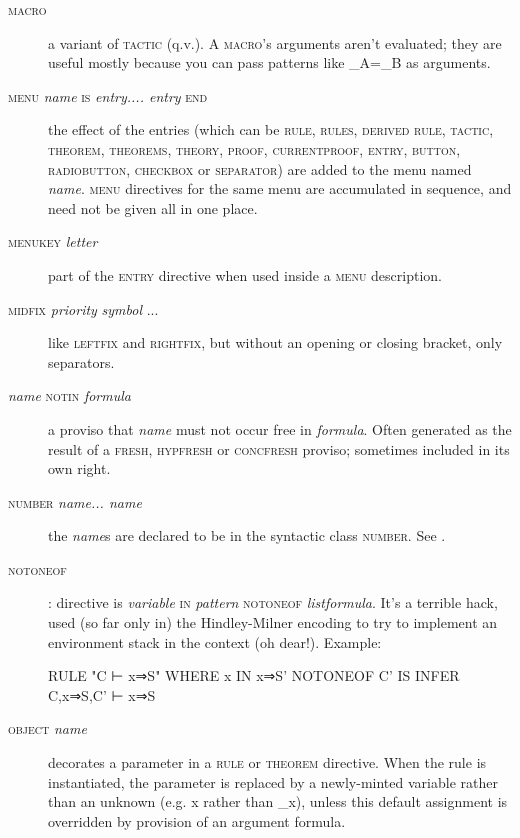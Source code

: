 \begin{description}
\item[\textsc{macro}] a variant of \textsc{tactic} (q.v.). A \textsc{macro}'s arguments aren't evaluated; they are useful mostly because you can pass patterns like \_A=\_B as arguments.

\item[\textsc{menu} \textit{name} \textsc{is} \textit{entry.... entry} \textsc{end}] the effect of the entries (which can be \textsc{rule, rules, derived rule, tactic, theorem, theorems, theory, proof, currentproof, entry, button, radiobutton, checkbox} or \textsc{separator)} are added to the menu named \textit{name}. \textsc{menu} directives for the same menu are accumulated in sequence, and need not be given all in one place.

\item[\textsc{menukey} \textit{letter}] part of the \textsc{entry} directive when used inside a \textsc{menu} description.

\item[\textsc{midfix} \textit{priority} \textit{symbol} ... \textit{\symbol}] like \textsc{leftfix} and \textsc{rightfix}, but without an opening or closing bracket, only separators.
 
\item[\textit{name} \textsc{notin} \textit{formula}] a proviso that \textit{name} must not occur free in \textit{formula}. Often generated as the result of a \textsc{fresh, hypfresh} or \textsc{concfresh} proviso; sometimes included in its own right.

\item[\textsc{number} \textit{name... name}] the \textit{name}s are declared to be in the syntactic class \textsc{number}. See .

\item[\textsc{notoneof}]: directive is \textit{variable} \textsc{in} \textit{pattern} \textsc{notoneof} \textit{listformula}. It's a terrible hack, used (so far only in) the Hindley-Milner encoding to try to implement an environment stack in the context (oh dear!). Example:
\begin{japeish}
RULE "C ⊢ x⇒S" WHERE x IN x⇒S' NOTONEOF C' IS INFER C,x⇒S,C' ⊢ x⇒S
\end{japeish}

\item[\textsc{object} \textit{name}] decorates a parameter in a \textsc{rule} or \textsc{theorem} directive. When the rule is instantiated, the parameter is replaced by a newly-minted variable rather than an unknown (e.g. x rather than \_x), unless this default assignment is overridden by provision of an argument formula.


\end{description}
